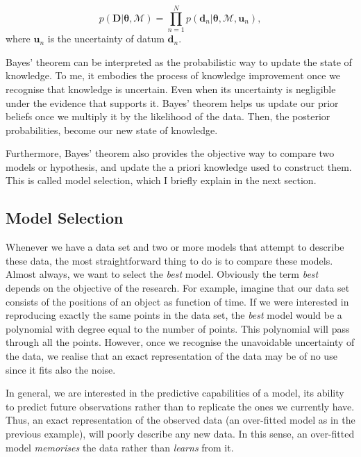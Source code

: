 \begin{equation}
\label{eq:lik_generativemodel}
p(\mathbf{D}|\boldsymbol{\theta},\mathcal{M}) = \prod_{n=1}^N p(\mathbf{d}_n|\boldsymbol{\theta},\mathcal{M},\mathbf{u}_n),
\end{equation}
where $\mathbf{u}_n$ is the uncertainty of datum $\mathbf{d}_n$.


Bayes' theorem can be interpreted as the probabilistic way to update the state of knowledge. To me, it embodies the process of knowledge improvement once we recognise that knowledge is uncertain. Even when its uncertainty is negligible under the evidence that supports it. Bayes' theorem helps us update our prior beliefs once we multiply it by the likelihood of the data. Then, the posterior probabilities, become our new state of knowledge. 

Furthermore, Bayes' theorem also provides the objective way to compare two models or hypothesis, and update the a priori knowledge used to construct them. This is called model selection, which I  briefly explain in the next section.

\subsection{Model Selection}
\label{sect:modelselection}

Whenever we have a data set and two or more models that attempt to describe these data, the most straightforward thing to do is to compare these models. Almost always, we want to select the \emph{best} model. Obviously the term \emph{best} depends on the objective of the research. For example, imagine that our data set consists of the positions of an object as function of time. If we were interested in reproducing exactly the same points in the data set, the \emph{best} model would be a polynomial with degree equal to the number of points. This polynomial will pass through all the points. However, once we recognise the unavoidable uncertainty of the data, we realise that an exact representation of the data may be of no use since it fits also the noise. 

In general, we are interested in the predictive capabilities of a model, its ability to predict future observations rather than to replicate the ones we currently have. Thus, an exact representation of the observed data (an over-fitted model as in the previous example), will poorly describe any new data. In this sense, an over-fitted model \emph{memorises} the data rather than \emph{learns} from it.

